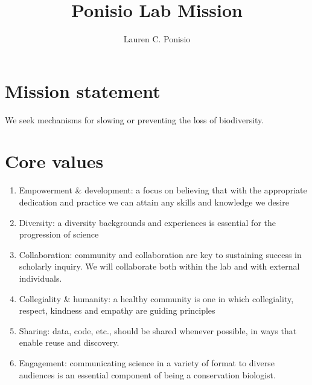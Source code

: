 \documentclass[12pt]{article}
\title{Ponisio Lab Mission}
\author{Lauren C. Ponisio}
\begin{document}
\maketitle

\section{Mission statement}
We seek mechanisms for slowing or preventing the loss of biodiversity.

\section{Core values}

\begin{enumerate}
\item Empowerment \& development: a focus on believing that with the
  appropriate dedication and practice we can attain any skills and
  knowledge we desire
\item Diversity: a diversity backgrounds and experiences is essential
  for the progression of science
\item Collaboration: community and collaboration are key to sustaining
  success in scholarly inquiry. We will collaborate both within the
  lab and with external individuals.
\item Collegiality \& humanity: a healthy community is one in which
  collegiality, respect, kindness and empathy are guiding principles
\item Sharing: data, code, etc., should be shared whenever possible,
  in ways that enable reuse and discovery.
\item Engagement: communicating science in a variety of format to
  diverse audiences is an essential component of being a conservation
  biologist.
\end{enumerate}
\end{document}
